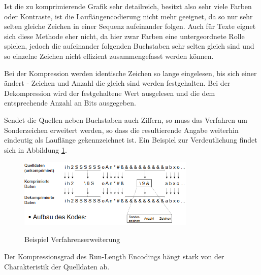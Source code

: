 \documentclass[11pt,a4paper,ngerman]{report}
\begin{document}
  	  
  	  
  		  Ist die zu komprimierende Grafik sehr detailreich, besitzt also sehr viele Farben oder Kontraste, ist die Lauflängencodierung nicht mehr geeignet,  da so nur sehr selten gleiche Zeichen in einer Sequenz aufeinander folgen.\cite{ITWissen.info} Auch für Texte eignet sich diese Methode eher nicht, da hier zwar Farben eine untergeordnete Rolle spielen, jedoch die aufeinander folgenden Buchstaben sehr selten gleich sind und so einzelne Zeichen nicht effizient zusammengefasst werden können.\cite[Seite 61]{Lange2021}
  		  
  		  Bei der Kompression werden identische Zeichen so lange eingelesen, bis sich einer ändert - Zeichen und Anzahl die gleich sind werden festgehalten. Bei der Dekompression wird der festgehaltene Wert ausgelesen und die dem entsprechende Anzahl an Bits ausgegeben.\cite{ITWissen.info}
  		  
  		  Sendet die Quellen neben Buchstaben auch Ziffern, so muss das Verfahren um Sonderzeichen erweitert werden, so dass die resultierende Angabe weiterhin eindeutig als Lauflänge gekennzeichnet ist. \cite[Seite 62]{Lange2021} Ein Beispiel zur Verdeutlichung findet sich in Abbildung \ref{Lange}.
  		  
  		   \begin{figure} [H]
  		  	\begin{center}
  		  		\includegraphics[width=0.75\textwidth]{alpha_ziffer.png}
  		  		\caption{Beispiel Verfahrenserweiterung}
  		  		\cite[Seite 62]{Lange2021}
  		  		\label{Lange}
  		  	\end{center}
  		  \end{figure}
  		  
  		  Der Kompressionsgrad des Run-Length Encodings hängt stark von der Charakteristik der Quelldaten ab. \cite[Seite 62]{Lange2021}
  		  
  		 
  		 
	
\end{document}
